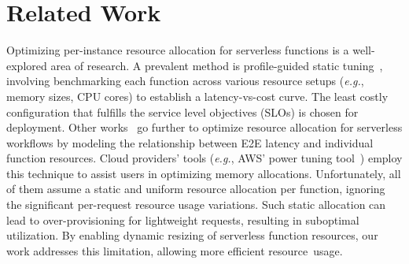 \vspace{-10pt}
\section{Related Work}
\label{sec:related}

Optimizing per-instance resource allocation for serverless functions is a well-explored area of research. A prevalent method is profile-guided static tuning~\cite{wang2018peeking, ShahradFGCBCLTR20}, involving benchmarking each function across various resource setups (\emph{e.g.}, memory sizes, CPU cores) to establish a latency-vs-cost curve. The least costly configuration that fulfills the service level objectives (SLOs) is chosen for deployment. Other works~\cite{pu2019shuffling, JinZXZHLJ23, zhang2024jolteon, ZhangTKCS21, ORION_MahgoubYSECB22,AQUATOPE_ZhouZD23} go further to optimize resource allocation for serverless workflows by modeling the relationship between E2E latency and individual function resources. Cloud providers' tools (\emph{e.g.}, AWS' power tuning tool~\cite{aws_lambda_power_tuning}) employ this technique to assist users in optimizing memory allocations. Unfortunately, all of them assume a static and uniform resource allocation per function, ignoring the significant per-request resource usage variations. Such static allocation can lead to over-provisioning for lightweight requests, resulting in suboptimal utilization. By enabling dynamic resizing of serverless function resources, our work addresses this limitation, allowing more efficient resource~usage.

